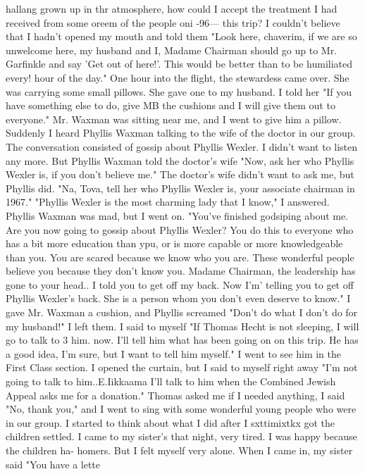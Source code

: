 {hallang grown up in thr 
atmosphere, how could I accept the treatment I had received from some oreem of the people oni 
-96— 
this trip? I couldn't believe that I hadn't opened my mouth and told them "Look here, 
chaverim, if we are so unwelcome here, my husband and I, Madame Chairman should go up to 
Mr. Garfinkle and say 'Get out of here!'. This would be better than to be humiliated every! 
hour of the day." 
One hour into the flight, the stewardess came over. She was carrying some small 
pillows. She gave one to my husband. I told her "If you have something else to do, give 
MB the cushions and I will give them out to everyone." Mr. Waxman was sitting near me, 
and I went to give him a pillow. Suddenly I heard Phyllis Waxman talking to the wife of 
the doctor in our group. The conversation consisted of gossip about Phyllis Wexler. I 
didn't want to listen any more. But Phyllis Waxman told the doctor's wife "Now, ask her 
who Phyllis Wexler is, if you don't believe me." The doctor's wife didn't want to ask me, 
but Phyllis did. "Na, Tova, tell her who Phyllis Wexler is, your associate chairman 
in 1967." 
"Phyllis Wexler is the most charming lady that I know," I answered. Phyllis Waxman 
was mad, but I went on. "You've finished godsiping about me. Are you now going to 
gossip about Phyllis Wexler? You do this to everyone who has a bit more education than 
ypu, or is more capable or more knowledgeable than you. You are scared because we know 
who you are. These wonderful people believe you because they don't know you. Madame 
Chairman, the leadership has gone to your head.. I told you to get off my back. Now I'm' 
telling you to get off Phyllis Wexler's back. She is a person whom you don't even deserve 
to know." I gave Mr. Waxman a cushion, and Phyllis screamed "Don't do what I don't do for 
my husband!" 
I left them. I said to myself "If Thomas Hecht is not sleeping, I will go to talk to 3 
him. now. I'll tell him what has been going on on this trip. He has a good idea, I'm sure, 
but I want to tell him myself." I went to see him in the First Class section. I opened 
the curtain, but I said to myself right away "I'm not going to talk to him..E.Iikkaama I'll 
talk to him when the Combined Jewish Appeal asks me for a donation." Thomas asked me 
if I needed anything, I said "No, thank you," and I went to sing with some wonderful 
young people who were in our group. 
I started to think about what I did after I sxttimixtkx got the children settled. 
I came to my sister's that night, very tired. I was happy because the children ha-
homers. But I felt myself very alone. When I came in, my sister said "You have a lette 
}
